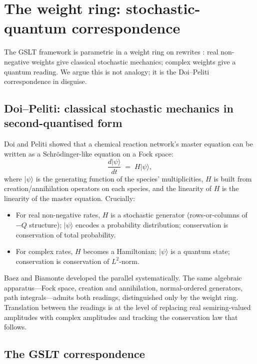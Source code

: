 \documentclass[11pt]{article}
\theoremstyle{plain}
\theoremstyle{definition}
\theoremstyle{remark}
\begin{document}
\section{The weight ring: stochastic-quantum correspondence}\label{sec:weightring}

The GSLT framework is parametric in a weight ring on rewrites \cite{gslt-context}: real non-negative weights give classical stochastic mechanics; complex weights give a quantum reading. We argue this is not analogy; it is the Doi--Peliti correspondence in disguise.

\subsection{Doi--Peliti: classical stochastic mechanics in second-quantised form}

Doi \cite{Doi76} and Peliti \cite{Peliti85} showed that a chemical reaction network's master equation can be written as a Schrödinger-like equation on a Fock space:
\[
\frac{d|\psi\rangle}{dt} \;=\; H |\psi\rangle,
\]
where $|\psi\rangle$ is the generating function of the species' multiplicities, $H$ is built from creation/annihilation operators on each species, and the linearity of $H$ is the linearity of the master equation. Crucially:

\begin{itemize}
\item For real non-negative rates, $H$ is a stochastic generator (rows-or-columns of $-Q$ structure); $|\psi\rangle$ encodes a probability distribution; conservation is conservation of total probability.
\item For complex rates, $H$ becomes a Hamiltonian; $|\psi\rangle$ is a quantum state; conservation is conservation of $L^2$-norm.
\end{itemize}

Baez and Biamonte \cite{BaezBiamonte18} developed the parallel systematically. The same algebraic apparatus---Fock space, creation and annihilation, normal-ordered generators, path integrals---admits both readings, distinguished only by the weight ring. Translation between the readings is at the level of replacing real semiring-valued amplitudes with complex amplitudes and tracking the conservation law that follows.

\subsection{The GSLT correspondence}
\end{document}
